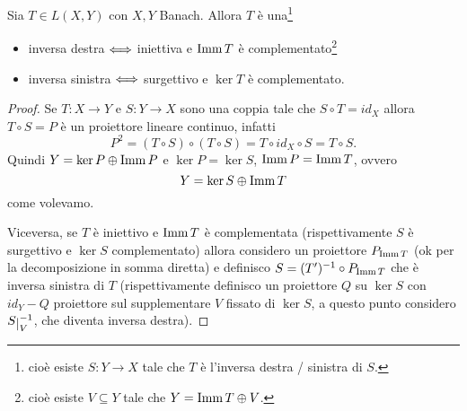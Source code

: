 \begin{proposition}\label{PrRetrazioniSezioniPerOperatoriLineariContinui}
Sia $T\in L(X,Y)$ con $X,Y$ Banach. Allora $T$ \`e una\footnote{cio\`e esiste $S:Y\to X$ tale che $T$ \`e l'inversa destra / sinistra di $S$.}
\begin{itemize}
    \item inversa destra $\Longleftrightarrow$ iniettiva e $\operatorname{Imm} T$ \`e complementato\footnote{cio\`e esiste $V\subseteq Y$ tale che $Y=\operatorname{Imm} T\oplus V$.}
    \item inversa sinistra $\Longleftrightarrow$ surgettivo e $\ker T$ \`e complementato.
\end{itemize}
\end{proposition}
\begin{proof}
Se $T:X\to Y$ e $S:Y\to X$ sono una coppia tale che $S\circ T=id_X$ allora $T\circ S=P$ \`e un proiettore lineare continuo, infatti
\[P^2=(T\circ S)\circ (T\circ S)=T\circ id_X \circ S=T\circ S.\]
Quindi $Y=\ker P\oplus \operatorname{Imm} P$ e $\ker P=\ker S$, $\operatorname{Imm} P=\operatorname{Imm} T$, ovvero
\[Y=\ker S\oplus \operatorname{Imm} T\]
come volevamo.
\medskip

Viceversa, se $T$ \`e iniettivo e $\operatorname{Imm} T$ \`e complementata (rispettivamente $S$ \`e surgettivo e $\ker S$ complementato) allora considero un proiettore $P_{\operatorname{Imm} T}$ (ok per la decomposizione in somma diretta) e definisco $S=(T')^{-1}\circ P_{\operatorname{Imm} T}$ che \`e inversa sinistra di $T$ (rispettivamente definisco un proiettore $Q$ su $\ker S$ con $id_Y-Q$ proiettore sul supplementare $V$ fissato di $\ker S$, a questo punto considero $S\res V\ii$, che diventa inversa destra).
\end{proof}


